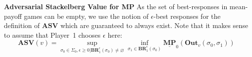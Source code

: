 
\noindent\textbf{Adversarial Stackelberg Value for MP} As the set of best-responses in mean-payoff games can be empty, we use the notion of $\epsilon$-best responses for the definition of $\mathbf{ASV}$ which are guaranteed to always exist. Note that it makes sense to assume that Player~1 chooses $\epsilon$ here:
\\





\begin{equation*}
    \mathbf{ASV}(v) = \sup\limits_{\sigma_0 \in \Sigma_0, \epsilon \geqslant 0| \mathbf{BR}^{\epsilon}_1(\sigma_0) \neq \varnothing}  \inf \limits_{\sigma_1 \in \mathbf{BR}^{\epsilon}_1(\sigma_0)} \underline{\mathbf{MP}}_0(\mathbf{Out}_v(\sigma_0,\sigma_1))
\end{equation*}

